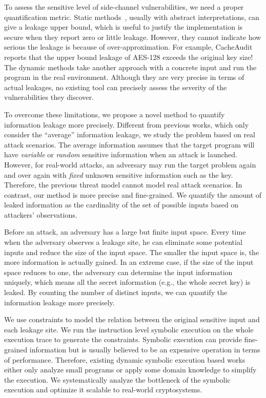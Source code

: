 To assess the sensitive level of side-channel vulnerabilities, we need a proper
quantification metric. Static methods~\cite{182946,5207642}, usually with
abstract interpretations, can give a leakage upper bound, which is useful to
justify the implementation is secure when they report zero or little leakage.
However, they cannot indicate how serious the leakage is because of
over-approximation. For example, CacheAudit~\cite{182946} reports that the upper
bound leakage of AES-128 exceeds the original key size! The dynamic methods take
another approach with a concrete input and run the program in the real
environment. Although they are very precise in terms of actual leakages, no
existing tool can precisely assess the severity of the vulnerabilities they
discover.

To overcome these limitations, we propose a novel method to quantify information
leakage more precisely. Different from previous works, which only consider the
``average'' information leakage, we study the problem based on real attack
scenarios. The average information assumes that the target program will have
\emph{variable} or \emph{random} sensitive information when an attack is
launched. However, for real-world attacks, an adversary may run the target
problem again and over again with \emph{fixed} unknown sensitive information
such as the key. Therefore, the previous threat model cannot model real attack
scenarios. In contrast, our method is more precise and fine-grained. We quantify
the amount of leaked information as the cardinality of the set of possible
inputs based on attackers' observations.


Before an attack, an adversary has a large but finite input space. Every time
when the adversary observes a leakage site, he can eliminate some potential
inputs and reduce the size of the input space. The smaller the input space is,
the more information is actually gained. In an extreme case, if the size of the
input space reduces to one, the adversary can determine the input information
uniquely, which means all the secret information (e.g., the whole secret key) is
leaked. By counting the number of distinct inputs, we can quantify the
information leakage more precisely.

We use constraints to model the relation between the original sensitive input
and each leakage site. We run the instruction level symbolic execution on the
whole execution trace to generate the constraints. Symbolic execution can
provide fine-grained information but is usually believed to be an expensive
operation in terms of performance. Therefore, existing dynamic symbolic
execution based works~\cite{203878,236338,Brotzman19Casym} either only analyze
small programs or apply some domain knowledge to simplify the execution. We
systematically analyze the bottleneck of the symbolic execution and optimize it
scalable to real-world cryptosystems.

